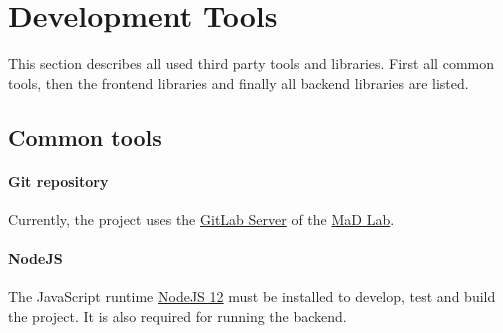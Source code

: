 \section{Development Tools}
\label{sec:development-tools}

This section describes all used third party tools and libraries.
First all common tools, then the frontend libraries and finally all backend libraries are listed.

\subsection{Common tools}

\paragraph{Git repository}
Currently, the project uses the \href{https://mad-srv.informatik.uni-erlangen.de/}{GitLab Server} of the \href{https://www.mad.tf.fau.de/}{MaD Lab}.

\paragraph{NodeJS}
The JavaScript runtime \href{https://nodejs.org}{NodeJS 12} must be installed to develop, test and build the project. 
It is also required for running the backend.

